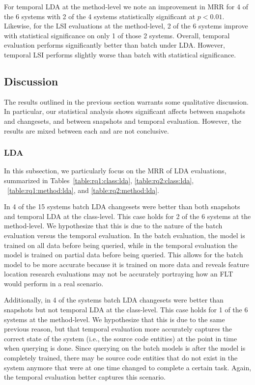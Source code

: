 For temporal LDA at the method-level we note an improvement in MRR for 4 of the 6 systems
with 2 of the 4 systems statistically significant at $p<0.01$.
Likewise, for the LSI evaluations at the method-level, 2 of the 6 systems improve
with statistical significance on only 1 of those 2 systems.
Overall, temporal evaluation performs significantly better than batch under LDA.
However, temporal LSI performs slightly worse than batch with statistical significance.



\subsection{Discussion}

The results outlined in the previous section warrants some qualitative discussion.
In particular, our statistical analysis shows significant affects between
snapshots and changesets, and between snapshots and temporal evaluation.
However, the results are mixed between each and are not conclusive.

\subsubsection{LDA}
In this subsection, we particularly focus on the MRR of LDA evaluations,
summarized in Tables~\ref{table:rq1:class:lda}, \ref{table:rq2:class:lda},
~\ref{table:rq1:method:lda}, and \ref{table:rq2:method:lda}.

In 4 of the 15 systems batch LDA changesets were better than both snapshots and temporal LDA at the class-level.
This case holds for 2 of the 6 systems at the method-level.
We hypothesize that this is due to the nature of the batch evaluation versus the temporal evaluation.
In the batch evaluation, the model is trained on all data before being queried,
while in the temporal evaluation the model is trained on partial data before being queried.
This allows for the batch model to be more accurate because it is trained on more data
and reveals feature location research evaluations may not be accurately portraying
how an FLT would perform in a real scenario.

Additionally, in 4 of the systems batch LDA changesets were better than snapshots but not temporal LDA at the class-level.
This case holds for 1 of the 6 systems at the method-level.
We hypothesize that this is due to the same previous reason, but that
temporal evaluation more accurately captures the correct state of the system (i.e., the source code entities)
at the point in time when querying is done.
Since querying on the batch models is after the model is completely trained,
there may be source code entities that do not exist in the system anymore
that were at one time changed to complete a certain task.
Again, the temporal evaluation better captures this scenario.

